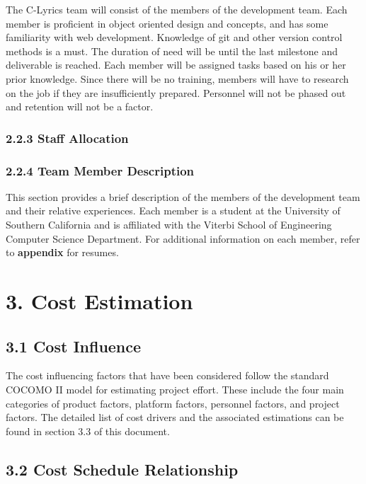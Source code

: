\documentclass[]{article}
\begin{document}
The C-Lyrics team will consist of the members of the development team.
Each member is proficient in object oriented design and concepts, and
has some familiarity with web development. Knowledge of git and other
version control methods is a must. The duration of need will be until
the last milestone and deliverable is reached. Each member will be
assigned tasks based on his or her prior knowledge. Since there will be
no training, members will have to research on the job if they are
insufficiently prepared. Personnel will not be phased out and retention
will not be a factor.

\subsubsection{2.2.3 Staff Allocation}\label{staff-allocation}

\subsubsection{2.2.4 Team Member
Description}\label{team-member-description}

This section provides a brief description of the members of the
development team and their relative experiences. Each member is a
student at the University of Southern California and is affiliated with
the Viterbi School of Engineering Computer Science Department. For
additional information on each member, refer to \textbf{appendix} for
resumes.

\section{3. Cost Estimation}\label{cost-estimation}

\subsection{3.1 Cost Influence}\label{cost-influence}

The cost influencing factors that have been considered follow the
standard COCOMO II model for estimating project effort. These include
the four main categories of product factors, platform factors, personnel
factors, and project factors. The detailed list of cost drivers and the
associated estimations can be found in section 3.3 of this document.

\subsection{3.2 Cost Schedule
Relationship}\label{cost-schedule-relationship}
\end{document}
